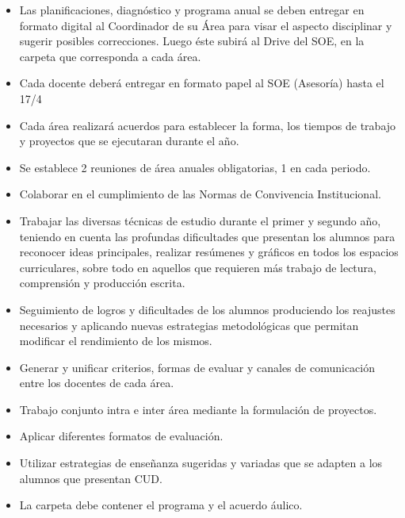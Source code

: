 \documentclass[../main]{subfiles}
\begin{document}
\begin{itemize}
    \item Las planificaciones, diagnóstico y programa anual se deben entregar en formato digital al Coordinador de su Área para visar el aspecto disciplinar y sugerir posibles correcciones. Luego éste subirá al Drive del SOE, en la carpeta que corresponda a cada área. 

\item Cada docente deberá entregar en formato papel al SOE (Asesoría) hasta el 17/4 

\item Cada área realizará acuerdos para establecer la forma, los tiempos de trabajo y proyectos que se ejecutaran durante el año. 

\item Se establece 2 reuniones de área anuales obligatorias, 1 en cada periodo. 

\item Colaborar en el cumplimiento de las Normas de Convivencia Institucional. 

\item Trabajar las diversas técnicas de estudio durante el primer y segundo año, teniendo en cuenta las profundas dificultades que presentan los alumnos para reconocer ideas principales, realizar resúmenes y gráficos en todos los espacios curriculares, sobre todo en aquellos que requieren más trabajo de lectura, comprensión y producción escrita.  

\item Seguimiento de logros y dificultades de los alumnos produciendo los reajustes necesarios y aplicando nuevas estrategias metodológicas que permitan modificar el rendimiento de los mismos. 

\item Generar y unificar criterios, formas de evaluar y canales de comunicación entre los docentes de cada área. 

\item Trabajo conjunto intra e inter área mediante la formulación de proyectos. 

\item Aplicar diferentes formatos de evaluación. 

\item Utilizar estrategias de enseñanza sugeridas y variadas que se adapten a los alumnos que presentan CUD. 

\item La carpeta debe contener el programa y el acuerdo áulico. 


\end{itemize}
\end{document}
